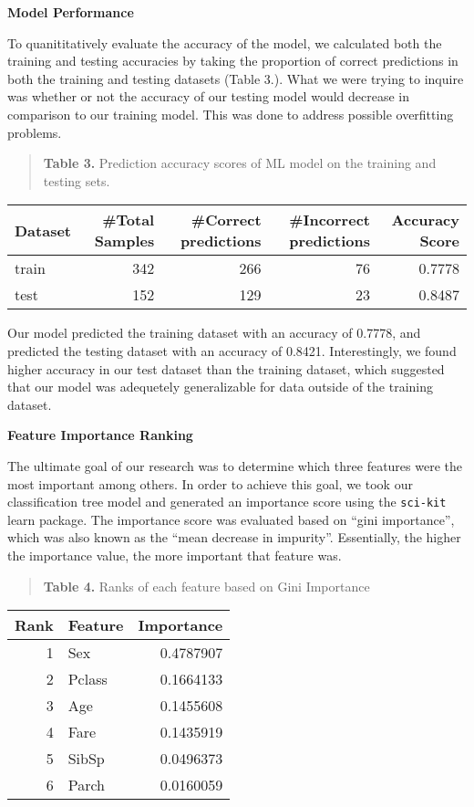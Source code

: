 \documentclass[]{article}
\begin{document}
\newpage

\textbf{Model Performance}

To quanititatively evaluate the accuracy of the model, we calculated
both the training and testing accuracies by taking the proportion of
correct predictions in both the training and testing datasets (Table
3.). What we were trying to inquire was whether or not the accuracy of
our testing model would decrease in comparison to our training model.
This was done to address possible overfitting problems.

\begin{quote}
\textbf{Table 3.} Prediction accuracy scores of ML model on the training
and testing sets.
\end{quote}

\begin{longtable}[]{@{}lrrrr@{}}
\toprule
Dataset & \#Total Samples & \#Correct predictions & \#Incorrect
predictions & Accuracy Score\tabularnewline
\midrule
\endhead
train & 342 & 266 & 76 & 0.7778\tabularnewline
test & 152 & 129 & 23 & 0.8487\tabularnewline
\bottomrule
\end{longtable}

Our model predicted the training dataset with an accuracy of 0.7778, and
predicted the testing dataset with an accuracy of 0.8421. Interestingly,
we found higher accuracy in our test dataset than the training dataset,
which suggested that our model was adequetely generalizable for data
outside of the training dataset.

\textbf{Feature Importance Ranking}

The ultimate goal of our research was to determine which three features
were the most important among others. In order to achieve this goal, we
took our classification tree model and generated an importance score
using the \texttt{sci-kit} learn package. The importance score was
evaluated based on ``gini importance'', which was also known as the
``mean decrease in impurity''. Essentially, the higher the importance
value, the more important that feature was.

\begin{quote}
\textbf{Table 4.} Ranks of each feature based on Gini Importance
\end{quote}

\begin{longtable}[]{@{}rlr@{}}
\toprule
Rank & Feature & Importance\tabularnewline
\midrule
\endhead
1 & Sex & 0.4787907\tabularnewline
2 & Pclass & 0.1664133\tabularnewline
3 & Age & 0.1455608\tabularnewline
4 & Fare & 0.1435919\tabularnewline
5 & SibSp & 0.0496373\tabularnewline
6 & Parch & 0.0160059\tabularnewline
\bottomrule
\end{longtable}
\end{document}
